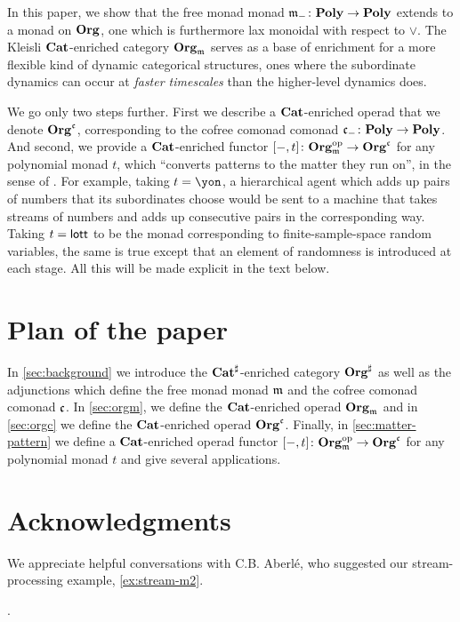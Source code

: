 In this paper, we show that the free monad monad $\mathfrak{m}_-\colon\mathbf{Poly}\to\mathbf{Poly}$ extends to a monad on $\mathbf{Org}$, one which is furthermore lax monoidal with respect to $\vee$. The Kleisli $\mathbf{Cat}$-enriched category $\mathbf{Org}_{\mathfrak{m}}$ serves as a base of enrichment for a more flexible kind of dynamic categorical structures, ones where the subordinate dynamics can occur at \emph{faster timescales} than the higher-level dynamics does.


We go only two steps further. First we describe a $\mathbf{Cat}$-enriched  operad that we denote $\mathbf{Org}^{\mathfrak{c}}$, corresponding to the cofree comonad comonad $\mathfrak{c}_-\colon\mathbf{Poly}\to\mathbf{Poly}$. And second, we provide a $\mathbf{Cat}$-enriched functor $[-,t]\colon\mathbf{Org}_{\mathfrak{m}}^{\textnormal{op}}\to\mathbf{Org}^{\mathfrak{c}}$ for any polynomial monad $t$, which ``converts patterns to the matter they run on'', in the sense of \cite{libkind2024pattern}. For example, taking $t=\yon$, a hierarchical agent which adds up pairs of numbers that its subordinates choose would be sent to a machine that takes streams of numbers and adds up consecutive pairs in the corresponding way. Taking $t=\mathsf{lott}$ to be the monad corresponding to finite-sample-space random variables, the same is true except that an element of randomness is introduced at each stage. All this will be made explicit in the text below.


\section*{Plan of the paper}

In \cref{sec:background} we introduce the $\mathbf{Cat}^\sharp$-enriched category $\mathbf{Org}^\sharp$ as well as the adjunctions which define the free monad monad $\mathfrak{m}$ and the cofree comonad comonad $\mathfrak{c}$. 
In \cref{sec:orgm}, we define the $\mathbf{Cat}$-enriched operad $\mathbf{Org}_{\mathfrak{m}}$ and in \cref{sec:orgc} we define the $\mathbf{Cat}$-enriched operad $\mathbf{Org}^{\mathfrak{c}}$. 
Finally, in \cref{sec:matter-pattern} we define a $\mathbf{Cat}$-enriched operad functor $[-, t] \colon \mathbf{Org}_{\mathfrak{m}}^{\textnormal{op}} \to \mathbf{Org}^{\mathfrak{c}}$ for any polynomial monad $t$ and give several applications. 

\section*{Acknowledgments}
We appreciate helpful conversations with C.B. Aberl\'e, who suggested our stream-processing example, \cref{ex:stream-m2}.

.